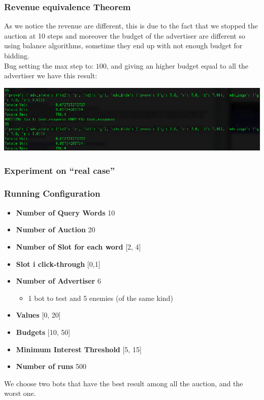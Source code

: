 \documentclass{beamer}
\begin{document}
\begin{frame}
\frametitle{Revenue equivalence Theorem}
As we notice the revenue are different, this is due to the fact that we stopped the auction at 10 steps and moreover the budget of the advertiser are different so using balance algorithms, sometime they end up with not enough budget for bidding.\\
\medskip
Bug setting the max step to: $100$, and giving an higher budget equal to all the advertiser we have this result:
\begin{center}
\includegraphics[scale=0.37]{img/revenuetheorem.png} 
\end{center}
\end{frame}

\subsubsection{Experiment on ``real case''}
\begin{frame}
\frametitle{Running Configuration}
\begin{itemize}
\item \textbf{Number of Query Words} 10
\item \textbf{Number of Auction} 20
\item \textbf{Number of Slot for each word} [2, 4]
\item \textbf{Slot i click-through } [0,1]
\item \textbf{Number of Advertiser} 6
\begin{itemize}
\item 1 bot to test and 5 enemies (of the same kind)
\end{itemize}
\item \textbf{Values} [0, 20]
\item \textbf{Budgets}  [10, 50]
\item \textbf{Minimum Interest Threshold} [5, 15]
\item \textbf{Number of runs } 500
\end{itemize}
We choose two bots that have the best result among all the auction, and the worst one.
\end{frame}
\end{document}
